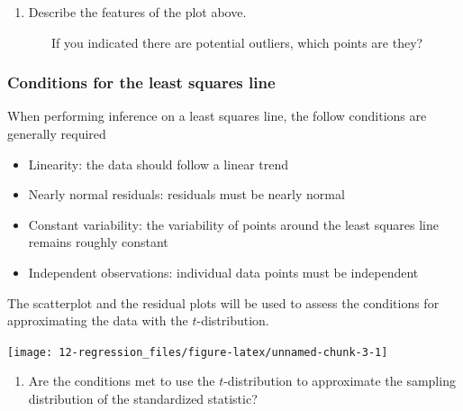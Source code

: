 \documentclass[
]{report}
\providecommand{\tightlist}{%
  \setlength{\itemsep}{0pt}\setlength{\parskip}{0pt}}
\begin{document}
\begin{enumerate}
\def\labelenumi{\arabic{enumi}.}
\setcounter{enumi}{3}
\tightlist
\item
  Describe the features of the plot above.
\end{enumerate}

\vspace{1in}

~~~~~~~If you indicated there are potential outliers, which points are they?

\vspace{0.5in}

\hypertarget{conditions-for-the-least-squares-line}{%
\subsubsection*{Conditions for the least squares line}\label{conditions-for-the-least-squares-line}}

When performing inference on a least squares line, the follow conditions are generally required

\begin{itemize}
\item
  Linearity: the data should follow a linear trend
\item
  Nearly normal residuals: residuals must be nearly normal
\item
  Constant variability: the variability of points around the least squares line remains roughly constant
\item
  Independent observations: individual data points must be independent
\end{itemize}

The scatterplot and the residual plots will be used to assess the conditions for approximating the data with the \(t\)-distribution.

\begin{center}\texttt{[image: 12-regression\_files/figure-latex/unnamed-chunk-3-1]} \end{center}

\begin{enumerate}
\def\labelenumi{\arabic{enumi}.}
\setcounter{enumi}{4}
\tightlist
\item
  Are the conditions met to use the \(t\)-distribution to approximate the sampling distribution of the standardized statistic?
\end{enumerate}

\vspace{1.5in}
\end{document}
